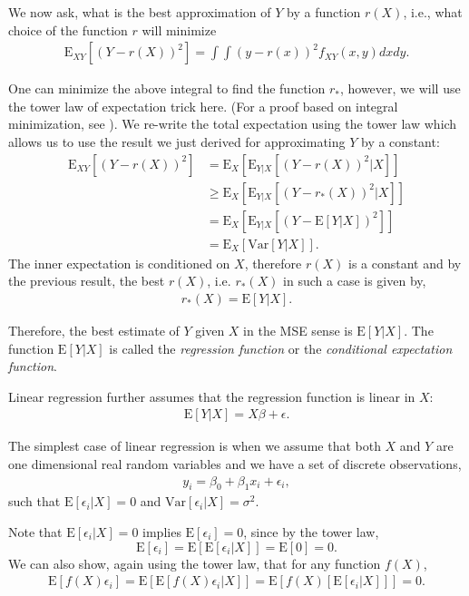\documentclass{amsart}
\theoremstyle{plain}
\numberwithin{equation}{section}
\begin{document}
We now ask, what is the best approximation of $Y$ by a function $r(X)$, i.e., what choice 
of the function $r$ will minimize
\begin{align*}
\mathrm{E}_{XY}[(Y-r(X))^2] = \int \int (y-r(x))^2 f_{XY}(x, y) dx dy.
\end{align*}

One can minimize the above integral to find the function $r_*$, however, we will use the tower law of 
expectation trick here. (For a proof based on integral minimization, see \cite[pp. 263]{papoulis2002probability}). We re-write the total expectation 
using the tower law which allows us to use the result we just derived
for approximating $Y$ by a constant:
\begin{align*}
\mathrm{E}_{XY}[(Y-r(X))^2] &= \mathrm{E}_X[\mathrm{E}_{Y|X}[(Y-r(X))^2|X]]\\
&\geq \mathrm{E}_X[\mathrm{E}_{Y|X}[(Y-r_*(X))^2|X]]\\
&= \mathrm{E}_X[\mathrm{E}_{Y|X}[(Y-\mathrm{E}[Y|X])^2]]\\
&= \mathrm{E}_X[\mathrm{Var}[Y|X]].
\end{align*}
The inner expectation is conditioned on $X$, therefore $r(X)$ is a constant and by the previous 
result, the best $r(X)$, i.e. $r_*(X)$ in such a case is given by,
\begin{align*}
r_*(X) = \mathrm{E}[Y|X].
\end{align*}

Therefore, the best estimate 
of $Y$ given $X$ in the MSE sense 
is $\mathrm{E}[Y|X]$. The function
$\mathrm{E}[Y|X]$ is called the 
\emph{regression function} or the 
\emph{conditional expectation function}.

Linear regression further assumes that the regression function is linear in $X$:
\begin{align*}
\mathrm{E}[Y|X] = X\beta + \epsilon.
\end{align*}

The simplest case of linear regression is when 
we assume that both $X$ and $Y$ are one dimensional
real random variables and we have a set of 
discrete observations,
\begin{align*}
y_i = \beta_0 + \beta_1 x_i + \epsilon_i,
\end{align*}
such that $\mathrm{E}[\epsilon_i|X] = 0$ and 
$\mathrm{Var}[\epsilon_i|X] = \sigma^2$.

Note that $\mathrm{E}[\epsilon_i|X] = 0$ implies $\mathrm{E}[\epsilon_i]=0$,
since by the tower law,
$$\mathrm{E}[\epsilon_i] = \mathrm{E}[\mathrm{E}[\epsilon_i|X]] = \mathrm{E}[0]=0.$$
We can also show, again using the tower law, that for any 
function $f(X)$,
\begin{align*}
\mathrm{E}[f(X)\epsilon_i] = \mathrm{E}[\mathrm{E}[f(X)\epsilon_i|X]] = \mathrm{E}[f(X)[\mathrm{E}[\epsilon_i|X]]]=0.
\end{align*}
\end{document}
